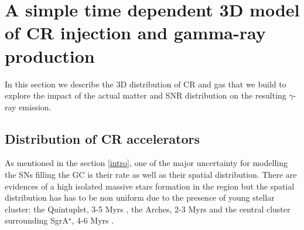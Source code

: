 \documentclass[a4paper,fleqn,usenatbib]{mnras}
\begin{document}

\section{A simple time dependent 3D model of CR injection and gamma-ray production}
\label{model}
In this section we describe the 3D distribution of CR and gas that we build to explore the impact of the actual matter and SNR distribution on the resulting $\gamma$-ray emission.

\subsection{Distribution of CR accelerators}


As mentioned in the section \ref{intro}, one of the major uncertainty for modelling the SNs filling the GC is their rate as well as their spatial distribution. There are evidences of a high isolated massive stars formation in the region \citep{2010ApJ...725..188M} but the spatial distribution has has to be non uniform due to the presence of young stellar cluster: the Quintuplet, 3-5 Myrs \citep{2004ApJ...611L.105N}, the Arches, 2-3 Myrs \citep{1999ApJ...525..750F} and the central cluster surrounding SgrA$^\star$, 4-6 Myrs \citep{2013ApJ...770...44L}. 
\end{document}
